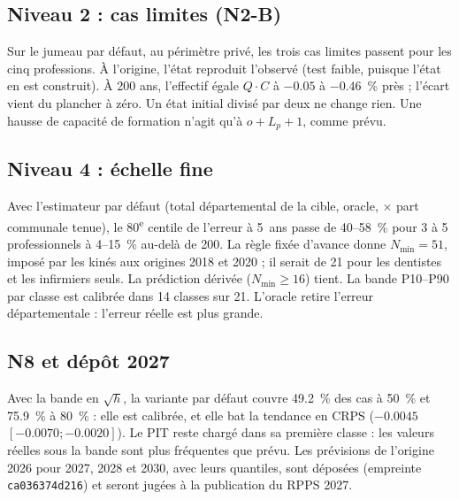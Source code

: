 \subsection{Niveau 2 : cas limites (N2-B)}
Sur le jumeau par défaut, au périmètre privé, les trois cas limites passent pour les cinq
professions. À l'origine, l'état reproduit l'observé (test faible, puisque l'état en est construit).
À 200 ans, l'effectif égale $Q \cdot C$ à $-\num{0.05}$ à $-\num{0.46}$\mesure{}~\% près ; l'écart vient
du plancher à zéro. Un état initial divisé par deux ne change rien. Une hausse de capacité de
formation n'agit qu'à $o + L_p + 1$\mesure{}, comme prévu.

\subsection{Niveau 4 : échelle fine}
Avec l'estimateur par défaut (total départemental de la cible, oracle, $\times$ part communale tenue),
le 80\textsuperscript{e} centile de l'erreur à 5~ans passe de 40--58\mesure{}~\% pour 3 à 5
professionnels à 4--15\mesure{}~\% au-delà de 200. La règle fixée d'avance donne
$N_{\min} = 51$\mesure{}, imposé par les kinés aux origines 2018 et 2020 ; il serait de 21 pour les
dentistes et les infirmiers seuls. La prédiction dérivée ($N_{\min} \ge 16$) tient. La bande
P10--P90 par classe est calibrée dans 14 classes sur 21\mesure{}. L'oracle retire l'erreur
départementale : l'erreur réelle est plus grande.

\subsection{N8 et dépôt 2027}
Avec la bande en $\sqrt h$, la variante par défaut couvre \num{49.2}\mesure{}~\% des cas à 50~\% et
\num{75.9}\mesure{}~\% à 80~\% : elle est calibrée, et elle bat la tendance en CRPS
($\num{-0.0045}$ $[\num{-0.0070} ; \num{-0.0020}]$\mesure{}). Le PIT reste chargé dans sa première
classe : les valeurs réelles sous la bande sont plus fréquentes que prévu. Les prévisions de
l'origine 2026 pour 2027, 2028 et 2030, avec leurs quantiles, sont déposées (empreinte
\texttt{ca036374d216}) et seront jugées à la publication du RPPS 2027.

